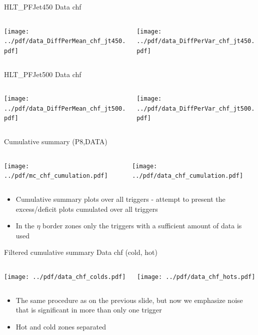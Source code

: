 \documentclass[9pt]{beamer}
\begin{document}
\begin{frame}[t]{HLT\_PFJet450 Data chf}
\begin{columns}[T]
  \begin{column}{.5\textwidth}
  \texttt{[image: ../pdf/data\_DiffPerMean\_chf\_jt450.pdf]}
  \end{column}
  \begin{column}{.5\textwidth}
  \texttt{[image: ../pdf/data\_DiffPerVar\_chf\_jt450.pdf]}
  \end{column}
\end{columns}
\end{frame}

\begin{frame}[t]{HLT\_PFJet500 Data chf}
\begin{columns}[T]
  \begin{column}{.5\textwidth}
  \texttt{[image: ../pdf/data\_DiffPerMean\_chf\_jt500.pdf]}
  \end{column}
  \begin{column}{.5\textwidth}
  \texttt{[image: ../pdf/data\_DiffPerVar\_chf\_jt500.pdf]}
  \end{column}
\end{columns}
\end{frame}

\begin{frame}[t]{Cumulative summary (P8,DATA)}
\begin{columns}[T]
  \begin{column}{.5\textwidth}
  \texttt{[image: ../pdf/mc\_chf\_cumulation.pdf]}
  \end{column}
  \begin{column}{.5\textwidth}
  \texttt{[image: ../pdf/data\_chf\_cumulation.pdf]}
  \end{column}
\end{columns}
\begin{itemize}
 \item Cumulative summary plots over all triggers - attempt to present the excess/deficit plots cumulated over all triggers
 \item In the $\eta$ border zones only the triggers with a sufficient amount of data is used
\end{itemize}
\end{frame}

\begin{frame}[t]{Filtered cumulative summary Data chf (cold, hot)}
\begin{columns}[T]
  \begin{column}{.5\textwidth}
  \texttt{[image: ../pdf/data\_chf\_colds.pdf]}
  \end{column}
  \begin{column}{.5\textwidth}
  \texttt{[image: ../pdf/data\_chf\_hots.pdf]}
  \end{column}
\end{columns}
\begin{itemize}
 \item The same procedure as on the previous slide, but now we emphasize noise that is significant in more than only one trigger
 \item Hot and cold zones separated
\end{itemize}
\end{frame}
\end{document}
